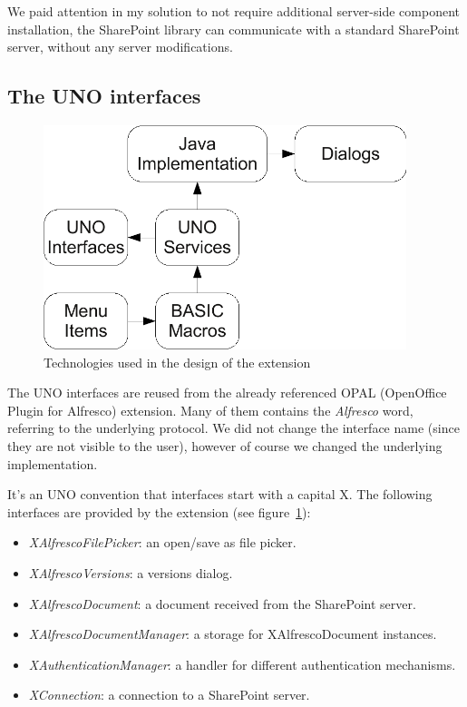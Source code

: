 We paid attention in my solution to not require additional server-side component
installation, the SharePoint library can communicate with a standard SharePoint
server, without any server modifications.

\subsection{The UNO interfaces}

\begin{figure}[H]
\centering
\includegraphics[width=400px,keepaspectratio]{design-technologies.pdf}
\caption{Technologies used in the design of the extension}
\label{fig:design-technologies}
\end{figure}

The UNO interfaces are reused from the already referenced OPAL (OpenOffice
Plugin for Alfresco) extension. Many of them contains the \emph{Alfresco} word,
referring to the underlying protocol. We did not change the interface name
(since they are not visible to the user), however of course we changed the
underlying implementation.

It's an UNO convention that interfaces start with a capital X. The following
interfaces are provided by the extension (see figure~\ref{fig:design-technologies}):

\begin{itemize}
\item \emph{XAlfrescoFilePicker}: an open/save as file picker.
\item \emph{XAlfrescoVersions}: a versions dialog.
\item \emph{XAlfrescoDocument}: a document received from the
SharePoint server.
\item \emph{XAlfrescoDocumentManager}: a storage for XAlfrescoDocument instances.
\item \emph{XAuthenticationManager}: a handler for different authentication mechanisms.
\item \emph{XConnection}: a connection to a SharePoint server.
\end{itemize}

